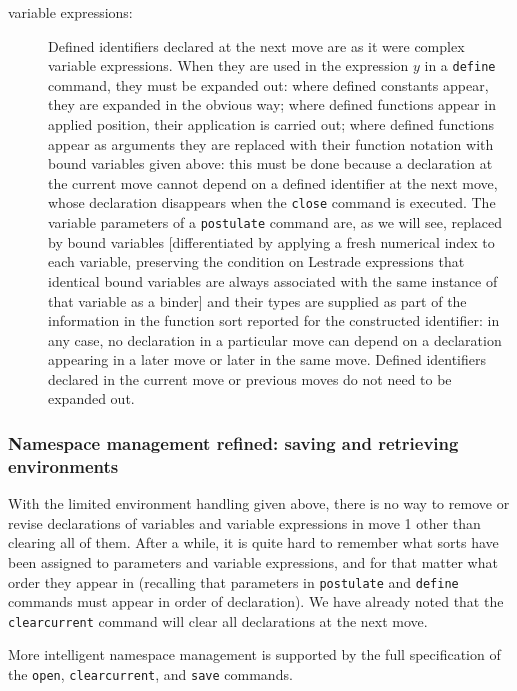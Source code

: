 \documentclass[12pt]{article}
\begin{document}
\begin{description}
\item[variable expressions:]  Defined identifiers declared at the next move are as it were complex variable expressions.  When they are used in the expression $y$ in a {\tt define} command, they must be expanded out:  where defined constants appear, they are expanded in the obvious way;  where defined functions appear in applied position, their application is carried out;  where defined functions appear as arguments they are replaced with their function notation with bound variables given above:  this must be done because a declaration at the current move cannot depend on a defined identifier at the next move, whose declaration disappears when the {\tt close} command is executed.  The variable parameters of a {\tt postulate} command are, as we will see, replaced by bound variables [differentiated by applying a fresh numerical index to each variable, preserving the condition on Lestrade expressions that identical bound variables are always associated with the same instance of that variable as a binder]  and their types are supplied as part of the information in the function sort reported for the constructed identifier:  in any case, no declaration in a particular move can depend on a declaration appearing in a later move or later in the same move.  Defined identifiers declared in the current move or previous moves do not need to be expanded out.

\end{description}

\subsubsection{Namespace management refined:  saving and retrieving environments}

With the limited environment handling given above, there is no way to remove or revise declarations of variables and variable expressions in move 1 other than clearing all of them.  After a while, it is quite hard to remember what sorts have been assigned to parameters and variable expressions, and for that matter what order they appear in (recalling that parameters in {\tt postulate} and {\tt define} commands must appear in order of declaration).  We have already noted
that the {\tt clearcurrent} command will clear all declarations at the next move.

More intelligent namespace management is supported by the full specification of the {\tt open}, {\tt clearcurrent}, and {\tt save} commands.
\end{document}
